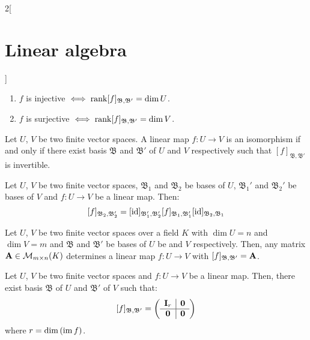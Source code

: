 \documentclass[../../../main.tex]{subfiles}
\begin{document}
\begin{multicols}{2}[\section{Linear algebra}]
\begin{corollary}
    \begin{enumerate}
      \item $f$ is injective $\iff\rank[f]_{\mathfrak{B},\mathfrak{B}'}=\dim U$.
      \item $f$ is surjective $\iff\rank[f]_{\mathfrak{B},\mathfrak{B}'}=\dim V$.
    \end{enumerate}
  \end{corollary}
  \begin{corollary}
    Let $U$, $V$ be two finite vector spaces. A linear map $f:U\rightarrow V$ is an isomorphism if and only if there exist basis $\mathfrak{B}$ and $\mathfrak{B}'$ of $U$ and $V$ respectively such that $[f]_{\mathfrak{B},\mathfrak{B}'}$ is invertible.
  \end{corollary}
  \begin{prop}
    Let $U$, $V$ be two finite vector spaces, $\mathfrak{B}_1$ and $\mathfrak{B}_2$ be bases of $U$, $\mathfrak{B}_1'$ and $\mathfrak{B}_2'$ be bases of $V$ and $f:U\rightarrow V$ be a linear map. Then: $$[f]_{\mathfrak{B}_2,\mathfrak{B}_2'}=[\mathrm{id}]_{\mathfrak{B}_1',\mathfrak{B}_2'}[f]_{\mathfrak{B}_1,\mathfrak{B}_1'}[\mathrm{id}]_{\mathfrak{B}_2,\mathfrak{B}_1}$$
  \end{prop}
  \begin{lemma}
    Let $U$, $V$ be two finite vector spaces over a field $K$ with $\dim U=n$ and $\dim V=m$ and $\mathfrak{B}$ and $\mathfrak{B}'$ be bases of $U$ be and $V$ respectively. Then, any matrix $\vb{A}\in\mathcal{M}_{m\times n}(K)$ determines a linear map $f:U\rightarrow V$ with $[f]_{\mathfrak{B},\mathfrak{B}'}=\vb{A}$.
  \end{lemma}
  \begin{theorem}
    Let $U$, $V$ be two finite vector spaces and $f:U\rightarrow V$ be a linear map. Then, there exist basis $\mathfrak{B}$ of $U$ and $\mathfrak{B}'$ of $V$ such that:
    $$[f]_{\mathfrak{B},\mathfrak{B}'}=\left(
      \begin{array}{c|c}
          \vb{I}_r & \vb{0} \\
          \hline
          \vb{0}   & \vb{0}
        \end{array}\right)$$
    where $r=\dim\left(\operatorname{im} f\right)$.
  \end{theorem}

\end{multicols}
\end{document}
